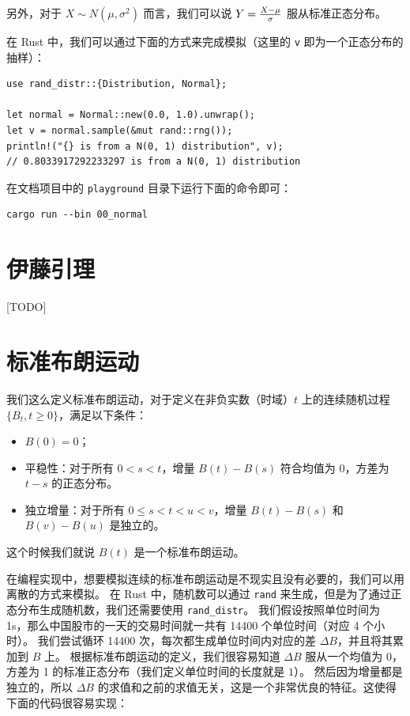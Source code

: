 \documentclass[utf8,a4paper,nofonts,9pt]{ctexbook}
\begin{document}
另外，对于 $X \sim N(\mu, \sigma^2)$ 而言，我们可以说 $Y = {X - \mu \over \sigma}$ 服从标准正态分布。

在 Rust 中，我们可以通过下面的方式来完成模拟（这里的 \verb|v| 即为一个正态分布的抽样）：

\begin{lstlisting}
use rand_distr::{Distribution, Normal};

let normal = Normal::new(0.0, 1.0).unwrap();
let v = normal.sample(&mut rand::rng());
println!("{} is from a N(0, 1) distribution", v);
// 0.8033917292233297 is from a N(0, 1) distribution
\end{lstlisting}

在文档项目中的 \verb|playground| 目录下运行下面的命令即可：

\begin{lstlisting}
cargo run --bin 00_normal
\end{lstlisting}


\section{伊藤引理}
\label{title:ItosLemma}

[TODO]


\section{标准布朗运动}

我们这么定义标准布朗运动，对于定义在非负实数（时域）$t$ 上的连续随机过程 $\{B_t, t \ge 0\}$，满足以下条件：

\begin{itemize}
    \item $B(0) = 0$；
    \item 平稳性：对于所有 $0 < s < t$，增量 $B(t) - B(s)$ 符合均值为 $0$，方差为 $t - s$ 的正态分布。
    \item 独立增量：对于所有 $0 \le s < t < u < v$，增量 $B(t) - B(s)$ 和 $B(v) - B(u)$ 是独立的。
\end{itemize}

这个时候我们就说 $B(t)$ 是一个标准布朗运动。

在编程实现中，想要模拟连续的标准布朗运动是不现实且没有必要的，我们可以用离散的方式来模拟。
在 Rust 中，随机数可以通过 \verb|rand| 来生成，但是为了通过正态分布生成随机数，我们还需要使用 \verb|rand_distr|。
我们假设按照单位时间为 1s，那么中国股市的一天的交易时间就一共有 14400 个单位时间（对应 4 个小时）。
我们尝试循环 14400 次，每次都生成单位时间内对应的差 $\Delta B$，并且将其累加到 $B$ 上。
根据标准布朗运动的定义，我们很容易知道 $\Delta B$ 服从一个均值为 0，方差为 1 的标准正态分布（我们定义单位时间的长度就是 $1$）。
然后因为增量都是独立的，所以 $\Delta B$ 的求值和之前的求值无关，这是一个非常优良的特征。这使得下面的代码很容易实现：
\end{document}
